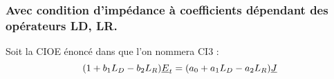 








\subsubsection{Avec condition d'impédance à coefficients dépendant des opérateurs LD, LR.}

Soit la CIOE énoncé dans \cite{soudais_3d_2017} que l'on nommera CI3 :
\begin{equation}
\label{eq_unicite_ci3_ci3}
( 1 + b_1 L_D - b_2 L_R)\underline{E}_t = (a_0 + a_1 L_D - a_2 L_R ) \underline{J}
\end{equation}

